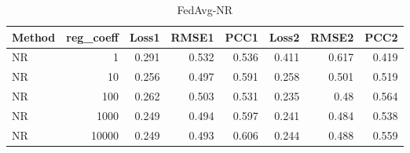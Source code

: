 \begin{table}
\caption{FedAvg-NR}
\begin{tabular}{lrrrrrrr}
\toprule
Method & reg_coeff & Loss1 & RMSE1 & PCC1 & Loss2 & RMSE2 & PCC2 \\
\midrule
NR & 1 & 0.291 & 0.532 & 0.536 & 0.411 & 0.617 & 0.419 \\
NR & 10 & 0.256 & 0.497 & 0.591 & 0.258 & 0.501 & 0.519 \\
NR & 100 & 0.262 & 0.503 & 0.531 & 0.235 & 0.48 & 0.564 \\
NR & 1000 & 0.249 & 0.494 & 0.597 & 0.241 & 0.484 & 0.538 \\
NR & 10000 & 0.249 & 0.493 & 0.606 & 0.244 & 0.488 & 0.559 \\
\bottomrule
\end{tabular}
\end{table}
